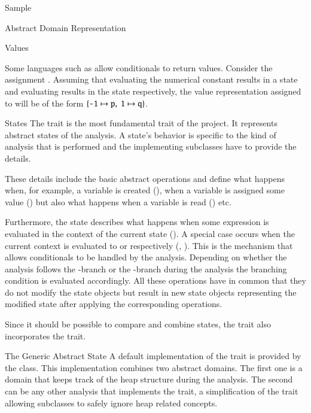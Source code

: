\begin{chapter}{Sample}
\begin{section}{Abstract Domain Representation}
\begin{subsection}{Values}
			\begin{example}
				\label{example:symbolicabstractvalue}
				Some languages such as \scala allow conditionals to return values. Consider the assignment . Assuming that evaluating the numerical constant  results in a state  and evaluating  results in the state  respectively, the value representation assigned to  will be of the form $\{\texttt{-1} \mapsto \texttt{p}, \ \texttt{1} \mapsto \texttt{q}\}$.
				\exampleend
			\end{example}
		\end{subsection}


		\begin{subsection}{States}
			The  trait is the most fundamental trait of the \sample project. It represents abstract states of the analysis. A state's behavior is specific to the kind of analysis that is performed and the implementing subclasses have to provide the details.

			These details include the basic abstract operations and define what happens when, for example, a variable is created (), when a variable is assigned some value () but also what happens when a variable is read () etc.

			Furthermore, the state describes what happens when some expression is evaluated in the context of the current state (). A special case occurs when the current context is evaluated to  or  respectively (, ). This is the mechanism that allows conditionals to be handled by the analysis. Depending on whether the analysis follows the -branch or the -branch during the analysis the branching condition is evaluated accordingly.
			All these operations have in common that they do not modify the state objects but result in new state objects representing the modified state after applying the corresponding operations.

			Since it should be possible to compare and combine states, the trait also incorporates the  trait.


			\begin{subsubsection}{The Generic Abstract State}
				A default implementation of the  trait is provided by the  class. This implementation combines two abstract domains. The first one is a domain that keeps track of the heap structure during the analysis. The second can be any other analysis that implements the  trait, a simplification of the  trait allowing subclasses to safely ignore heap related concepts.


\end{subsubsection}
\end{subsection}
\end{section}
\end{chapter}
